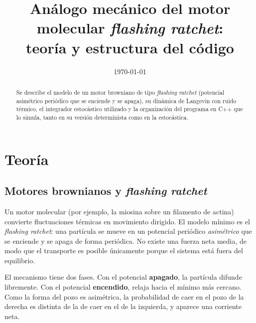 \documentclass[11pt,a4paper]{article}
\title{Análogo mecánico del motor molecular \emph{flashing ratchet}:\\ teoría y estructura del código}
\date{\today}
\begin{document}
\maketitle

\begin{abstract}
Se describe el modelo de un motor browniano de tipo \emph{flashing ratchet} (potencial asimétrico periódico que se enciende y se apaga), su dinámica de Langevin con ruido térmico, el integrador estocástico utilizado y la organización del programa en C++ que lo simula, tanto en su versión determinista como en la estocástica.
\end{abstract}

\section{Teoría}

\subsection{Motores brownianos y \emph{flashing ratchet}}
Un motor molecular (por ejemplo, la miosina sobre un filamento de actina) convierte fluctuaciones térmicas en movimiento dirigido. El modelo mínimo es el \emph{flashing ratchet}: una partícula se mueve en un potencial periódico \emph{asimétrico} que se enciende y se apaga de forma periódica. No existe una fuerza neta media, de modo que el transporte es posible únicamente porque el sistema está fuera del equilibrio.

El mecanismo tiene dos fases. Con el potencial \textbf{apagado}, la partícula difunde libremente. Con el potencial \textbf{encendido}, relaja hacia el mínimo más cercano. Como la forma del pozo es asimétrica, la probabilidad de caer en el pozo de la derecha es distinta de la de caer en el de la izquierda, y aparece una corriente neta.
\end{document}
